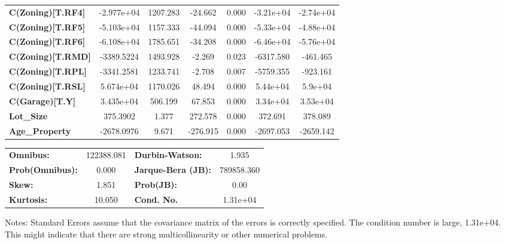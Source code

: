 \documentclass{report}
\begin{document}
\begin{center}
\begin{tabular}{lcccccc}
\textbf{C(Zoning)[T.RF4]}   &   -2.977e+04  &     1207.283     &   -24.662  &         0.000        &    -3.21e+04    &    -2.74e+04     \\
\textbf{C(Zoning)[T.RF5]}   &   -5.103e+04  &     1157.333     &   -44.094  &         0.000        &    -5.33e+04    &    -4.88e+04     \\
\textbf{C(Zoning)[T.RF6]}   &   -6.108e+04  &     1785.651     &   -34.208  &         0.000        &    -6.46e+04    &    -5.76e+04     \\
\textbf{C(Zoning)[T.RMD]}   &   -3389.5224  &     1493.928     &    -2.269  &         0.023        &    -6317.580    &     -461.465     \\
\textbf{C(Zoning)[T.RPL]}   &   -3341.2581  &     1233.741     &    -2.708  &         0.007        &    -5759.355    &     -923.161     \\
\textbf{C(Zoning)[T.RSL]}   &    5.674e+04  &     1170.026     &    48.494  &         0.000        &     5.44e+04    &      5.9e+04     \\
\textbf{C(Garage)[T.Y]}     &    3.435e+04  &      506.199     &    67.853  &         0.000        &     3.34e+04    &     3.53e+04     \\
\textbf{Lot\_Size}          &     375.3902  &        1.377     &   272.578  &         0.000        &      372.691    &      378.089     \\
\textbf{Age\_Property}      &   -2678.0976  &        9.671     &  -276.915  &         0.000        &    -2697.053    &    -2659.142     \\
\bottomrule
\end{tabular}
\begin{tabular}{lclc}
\textbf{Omnibus:}       & 122388.081 & \textbf{  Durbin-Watson:     } &     1.935   \\
\textbf{Prob(Omnibus):} &    0.000   & \textbf{  Jarque-Bera (JB):  } & 789858.360  \\
\textbf{Skew:}          &    1.851   & \textbf{  Prob(JB):          } &      0.00   \\
\textbf{Kurtosis:}      &   10.050   & \textbf{  Cond. No.          } &  1.31e+04   \\
\bottomrule
\end{tabular}
\end{center}

Notes: \newline
 [1] Standard Errors assume that the covariance matrix of the errors is correctly specified. \newline
 [2] The condition number is large, 1.31e+04. This might indicate that there are \newline
 strong multicollinearity or other numerical problems.
\end{document}

